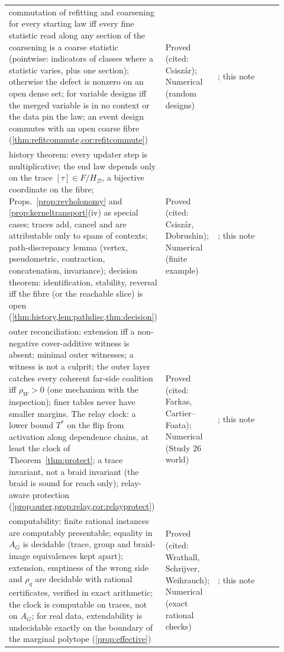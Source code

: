 \documentclass[11pt]{article}
\theoremstyle{definition}\newtheorem{definition}[theorem]{Definition}\newtheorem{remark}[theorem]{Remark}\newtheorem{example}[theorem]{Example}\newtheorem{problem}[theorem]{Open problem}\crefname{problem}{Problem}{Problems}
\begin{document}
{\begin{longtable}{p{0.46\linewidth}p{0.16\linewidth}p{0.3\linewidth}}
\rowcolor{stNew} commutation of refitting and coarsening for every starting law iff every fine statistic read along any section of the coarsening is a coarse statistic (pointwise: indicators of classes where a statistic varies, plus one section); otherwise the defect is nonzero on an open dense set; for variable designs iff the merged variable is in no context or the data pin the law; an event design commutes with an open coarse fibre (\cref{thm:refitcommute,cor:refitcommute}) & Proved (cited: Csisz\'ar); Numerical (random designs) & \cite{Csiszar1975}; this note\\
\rowcolor{stNew} history theorem: every updater step is multiplicative; the end law depends only on the trace $[\tau]\in F/H_{\mathcal D}$, a bijective coordinate on the fibre; Props.~\ref{prop:revholonomy} and \ref{prop:kerneltransport}(iv) as special cases; traces add, cancel and are attributable only to spans of contexts; path-discrepancy lemma (vertex, pseudometric, contraction, concatenation, invariance); decision theorem: identification, stability, reversal iff the fibre (or the reachable slice) is open (\cref{thm:history,lem:pathdisc,thm:decision}) & Proved (cited: Csisz\'ar, Dobrushin); Numerical (finite example) & \cite{Csiszar1975,Dobrushin1956}; this note\\
\rowcolor{stNew} outer reconciliation: extension iff a non-negative cover-additive witness is absent; minimal outer witnesses; a witness is not a culprit; the outer layer catches every coherent far-side coalition iff $\rho_W>0$ (one mechanism with the inspection); finer tables never have smaller margins. The relay clock: a lower bound $T^\ast$ on the flip from activation along dependence chains, at least the clock of Theorem~\ref{thm:protect}; a trace invariant, not a braid invariant (the braid is sound for reach only); relay-aware protection (\cref{prop:outer,prop:relay,cor:relayprotect}) & Proved (cited: Farkas, Cartier--Foata); Numerical (Study 26 world) & \cite{CartierFoata1969}; this note\\
\rowcolor{stNew} computability: finite rational instances are computably presentable; equality in $A_G$ is decidable (trace, group and braid-image equivalences kept apart); extension, emptiness of the wrong side and $\rho_q$ are decidable with rational certificates, verified in exact arithmetic; the clock is computable on traces, not on $A_G$; for real data, extendability is undecidable exactly on the boundary of the marginal polytope (\cref{prop:effective}) & Proved (cited: Wrathall, Schrijver, Weihrauch); Numerical (exact rational checks) & \cite{Wrathall1988,Schrijver1986,Weihrauch2000,DowneyMelnikov2025}; this note\\

\end{longtable}}
\end{document}
